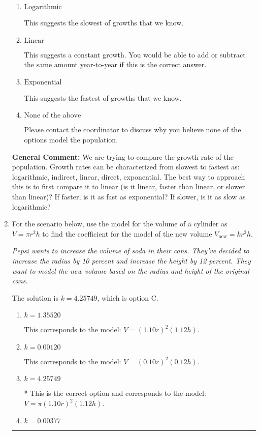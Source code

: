 \documentclass{extbook}[14pt]
\newcommand{\litem}[1]{\item #1

\rule{\textwidth}{0.4pt}}
\begin{document}
\begin{enumerate}
{\begin{enumerate}[label=\Alph*.]
This suggests a growth faster than constant but slower than exponential.
\item \( \text{Logarithmic} \)

This suggests the slowest of growths that we know.
\item \( \text{Linear} \)

This suggests a constant growth. You would be able to add or subtract the same amount year-to-year if this is the correct answer.
\item \( \text{Exponential} \)

This suggests the fastest of growths that we know.
\item \( \text{None of the above} \)

Please contact the coordinator to discuss why you believe none of the options model the population.
\end{enumerate}

\textbf{General Comment:} We are trying to compare the growth rate of the population. Growth rates can be characterized from slowest to fastest as: logarithmic, indirect, linear, direct, exponential. The best way to approach this is to first compare it to linear (is it linear, faster than linear, or slower than linear)? If faster, is it as fast as exponential? If slower, is it as slow as logarithmic?
}
\litem{
For the scenario below, use the model for the volume of a cylinder as $V = \pi r^2 h$ to find the coefficient for the model of the new volume $V_{\text{new}} = k r^2 h$.

\begin{center}
    \textit{ Pepsi wants to increase the volume of soda in their cans. They've decided to increase the radius by 10 percent and increase the height by 12 percent. They want to model the new volume based on the radius and height of the original cans. }
\end{center}
The solution is \( k = 4.25749 \), which is option C.\begin{enumerate}[label=\Alph*.]
\item \( k = 1.35520 \)

This corresponds to the model: $V = (1.10 r)^2 (1.12 h)$.
\item \( k = 0.00120 \)

This corresponds to the model: $V = (0.10 r)^2 (0.12 h)$.
\item \( k = 4.25749 \)

* This is the correct option and corresponds to the model: $V = \pi (1.10 r)^2 (1.12 h)$.
\item \( k = 0.00377 \)


\end{enumerate}}
\end{enumerate}
\end{document}
